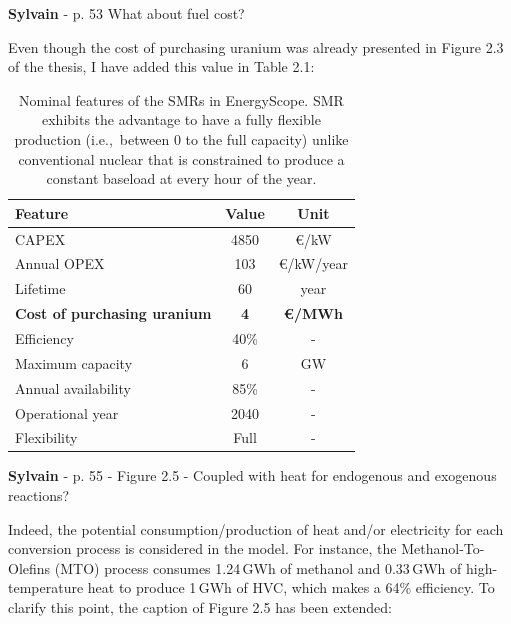 \documentclass[12pt,a4paper]{article}
\def\ie{i.e.,\ }
\begin{document}
\begin{mdframed}[style=comment] %
{\color{purple} \textbf{Sylvain}} - p. 53 What about fuel cost?
\end{mdframed}

\noindent Even though the cost of purchasing uranium was already presented in Figure 2.3 of the thesis, I have added this value {\color{blue}in Table 2.1}:

\begin{table}[htbp!]
\caption{Nominal features of the SMRs in EnergyScope. SMR exhibits the advantage to have a fully flexible production (\ie between 0 to the full capacity) unlike conventional nuclear that is constrained to produce a constant baseload at every hour of the year.}
\label{tab:SMR_features}
\begin{minipage}{\linewidth}
\centering
\begin{tabular}{l c c}
\hline
\textbf{Feature} & \textbf{Value} & \textbf{Unit}\\
\hline
CAPEX & 4850 & €/kW \\
Annual OPEX & 103 & €/kW/year \\
Lifetime & 60 & year \\
\textbf{Cost of purchasing uranium} & \textbf{4} & \textbf{€/MWh}\\
Efficiency & 40\% & -\\
Maximum capacity & 6 & GW \\
Annual availability & 85\% & -\\
Operational year & 2040 & - \\
Flexibility & Full & - \\
\hline						

\end{tabular}
\end{minipage}
\end{table}

\begin{mdframed}[style=comment] %
{\color{purple} \textbf{Sylvain}} - p. 55 - Figure 2.5 - Coupled with heat for endogenous and exogenous reactions?
\end{mdframed}

\noindent Indeed, the potential consumption/production of heat and/or electricity for each conversion process is considered in the model. For instance, the Methanol-To-Olefins (MTO) process consumes 1.24\,GWh of methanol and 0.33\,GWh of high-temperature heat to produce 1\,GWh of HVC, which makes a 64\% efficiency. To clarify this point, {\color{blue}the caption of Figure 2.5} has been extended:
\end{document}
